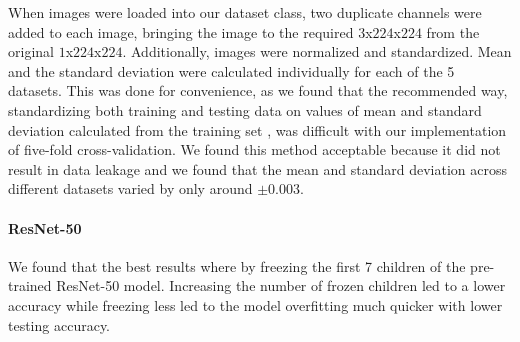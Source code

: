 \documentclass[11pt]{article}
\begin{document}
\begin{flushleft}
    When images were loaded into our dataset class, two duplicate channels were 
    added to each image, bringing the image to the required $3$x$224$x$224$ from the 
    original $1$x$224$x$224$. 
    \newline
    \newline
    Additionally, images were normalized and standardized. 
    Mean and the standard deviation were calculated individually for each of 
    the 5 datasets. This was done for convenience, as we found that the 
    recommended way, standardizing both training and testing data on 
    values of mean and standard deviation calculated from the training set \cite{Medium},
    was difficult with our implementation of five-fold cross-validation. 
    \newline
    \newline
    We found this method acceptable because it did not result in data leakage 
    and we found that the mean and standard deviation across different datasets 
    varied by only around $\pm 0.003$.
\end{flushleft} 

\paragraph{\noindent\textbf{\LARGE{ResNet-50}}}
\begin{flushleft}
    We found that the best results where by freezing the first 7 children 
    of the pre-trained ResNet-50 model. Increasing the number of frozen children 
    led to a lower accuracy while freezing less led to the model overfitting 
    much quicker with lower testing accuracy.
\end{flushleft} 
    

\end{document}
